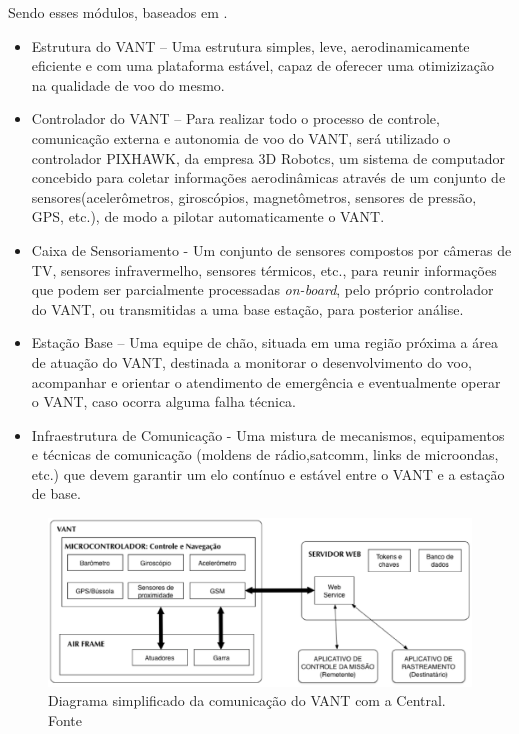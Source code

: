 Sendo esses módulos, baseados em .

\begin{itemize}
	\item Estrutura do VANT – Uma estrutura simples, leve, aerodinamicamente eficiente e com uma plataforma estável, capaz de oferecer uma otimizização na qualidade de voo do mesmo. 
	\item Controlador do VANT – Para realizar todo o processo de controle, comunicação externa e autonomia de voo do VANT, será utilizado o controlador PIXHAWK, da empresa 3D Robotcs, um sistema de computador concebido para coletar informações aerodinâmicas através de um conjunto de sensores(acelerômetros, giroscópios, magnetômetros, sensores de pressão, GPS, etc.), de modo a pilotar automaticamente o VANT.
	\item Caixa de Sensoriamento - Um conjunto de sensores compostos por câmeras de TV, sensores infravermelho, sensores térmicos, etc., para reunir informações que podem ser parcialmente processadas \textit{on-board}, pelo próprio controlador do VANT, ou transmitidas a uma base estação, para posterior análise.
	\item Estação Base – Uma equipe de chão, situada em uma região próxima a área de atuação do VANT, destinada a monitorar o desenvolvimento do voo, acompanhar e orientar o atendimento de emergência e eventualmente operar o VANT, caso ocorra alguma falha técnica. 
	\item Infraestrutura de Comunicação - Uma mistura de mecanismos, equipamentos e técnicas de comunicação (moldens de rádio,satcomm, links de microondas, etc.) que devem garantir um elo contínuo e estável entre o VANT e a estação de base. 
\end{itemize}


\begin{figure}[H]
	\centering
	  \includegraphics[keepaspectratio=true,scale=0.7]{figuras/diagrama.eps}
	\caption[Diagrama simplificado da comunicação do VANT com a Central.]{Diagrama simplificado da comunicação do VANT com a Central. Fonte \cite{Branco}}
	\label{fig:diagrama}
\end{figure}

